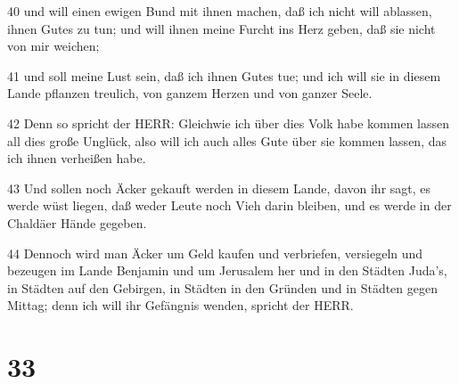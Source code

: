 \par 40 und will einen ewigen Bund mit ihnen machen, daß ich nicht will ablassen, ihnen Gutes zu tun; und will ihnen meine Furcht ins Herz geben, daß sie nicht von mir weichen;
\par 41 und soll meine Lust sein, daß ich ihnen Gutes tue; und ich will sie in diesem Lande pflanzen treulich, von ganzem Herzen und von ganzer Seele.
\par 42 Denn so spricht der HERR: Gleichwie ich über dies Volk habe kommen lassen all dies große Unglück, also will ich auch alles Gute über sie kommen lassen, das ich ihnen verheißen habe.
\par 43 Und sollen noch Äcker gekauft werden in diesem Lande, davon ihr sagt, es werde wüst liegen, daß weder Leute noch Vieh darin bleiben, und es werde in der Chaldäer Hände gegeben.
\par 44 Dennoch wird man Äcker um Geld kaufen und verbriefen, versiegeln und bezeugen im Lande Benjamin und um Jerusalem her und in den Städten Juda's, in Städten auf den Gebirgen, in Städten in den Gründen und in Städten gegen Mittag; denn ich will ihr Gefängnis wenden, spricht der HERR.

\chapter{33}

